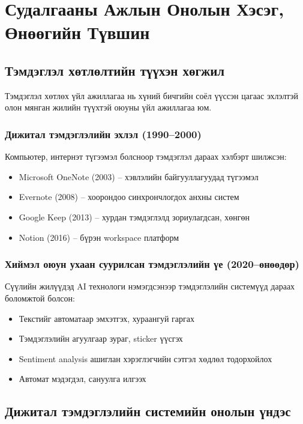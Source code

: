 \chapter{Судалгааны Ажлын Онолын Хэсэг, Өнөөгийн Түвшин}
\label{ch:literature}

\section{Тэмдэглэл хөтлөлтийн түүхэн хөгжил}

Тэмдэглэл хөтлөх үйл ажиллагаа нь хүний бичгийн соёл үүссэн цагаас эхлэлтэй олон
мянган жилийн түүхтэй оюуны үйл ажиллагаа юм.

\subsection{Дижитал тэмдэглэлийн эхлэл (1990--2000)}

Компьютер, интернэт түгээмэл болсноор тэмдэглэл дараах хэлбэрт шилжсэн:
\begin{itemize}
  \item Microsoft OneNote (2003) -- хэвлэлийн байгууллагуудад түгээмэл
  \item Evernote (2008) -- хоорондоо синхрончлогдох анхны систем
  \item Google Keep (2013) -- хурдан тэмдэглэлд зориулагдсан, хөнгөн
  \item Notion (2016) -- бүрэн workspace платформ
\end{itemize}

\subsection{Хиймэл оюун ухаан суурилсан тэмдэглэлийн үе (2020--өнөөдөр)}

Сүүлийн жилүүдэд AI технологи нэмэгдсэнээр тэмдэглэлийн системүүд дараах боломжтой болсон:
\begin{itemize}
  \item Текстийг автоматаар эмхэтгэх, хураангуй гаргах
  \item Тэмдэглэлийн агуулгаар зураг, sticker үүсгэх
  \item Sentiment analysis ашиглан хэрэглэгчийн сэтгэл хөдлөл тодорхойлох
  \item Автомат мэдэгдэл, сануулга илгээх
\end{itemize}

\section{Дижитал тэмдэглэлийн системийн онолын үндэс}

